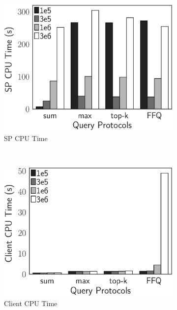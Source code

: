 \begin{figure}[t]
  \centering
  \begin{subfigure}[b]{.33\linewidth}
    \centering
    \includegraphics[height=\ht\figbox]{exp-figs/aggregate-queries/cardinality_sp.eps}
    \caption{SP CPU Time}
  \end{subfigure}~%
  \begin{subfigure}[b]{.33\linewidth}
    \centering
    \includegraphics[height=\ht\figbox]{exp-figs/aggregate-queries/cardinality_client.eps}
    \caption{Client CPU Time}
  \end{subfigure}~%
  \begin{subfigure}[b]{.33\linewidth}
    \centering

\end{subfigure}
\end{figure}

